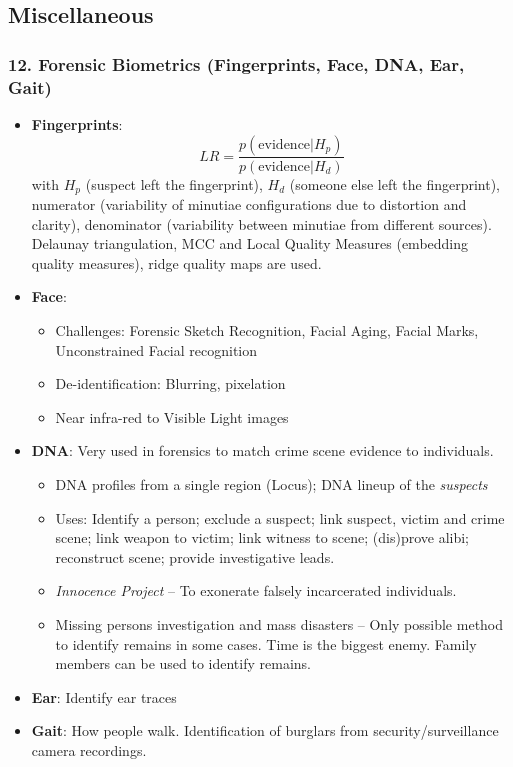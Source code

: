 \documentclass[a4paper]{article}
\begin{document}
  \subsection*{Miscellaneous}
    
    \subsubsection*{12. Forensic Biometrics (Fingerprints, Face, DNA, Ear, Gait)}
      \begin{itemize}
        \item \textbf{Fingerprints}: $$LR = \frac{p(\text{evidence}|H_p)}{p(\text{evidence}|H_d)}$$
        with $H_p$ (suspect left the fingerprint), $H_d$ (someone else left the fingerprint), numerator (variability of minutiae configurations due to distortion and clarity), denominator (variability between minutiae from different sources). Delaunay triangulation, MCC and Local Quality Measures (embedding quality measures), ridge quality maps are used.
        \item \textbf{Face}:
        \begin{itemize}
          \item Challenges: Forensic Sketch Recognition, Facial Aging, Facial Marks, Unconstrained Facial recognition
          \item De-identification: Blurring, pixelation
          \item Near infra-red to Visible Light images
        \end{itemize}
        \item \textbf{DNA}: Very used in forensics to match crime scene evidence to individuals.
        \begin{itemize}
          \item DNA profiles from a single region (Locus); DNA lineup of the \emph{suspects}
          \item Uses: Identify a person; exclude a suspect; link suspect, victim and crime scene; link weapon to victim; link witness to scene; (dis)prove alibi; reconstruct scene; provide investigative leads.
          \item \emph{Innocence Project} -- To exonerate falsely incarcerated individuals.
          \item Missing persons investigation and mass disasters -- Only possible method to identify remains in some cases. Time is the biggest enemy. Family members can be used to identify remains.
        \end{itemize}
        \item \textbf{Ear}: Identify ear traces
        \item \textbf{Gait}: How people walk. Identification of burglars from security/surveillance camera recordings.
      \end{itemize}
      \newpage
\end{document}
